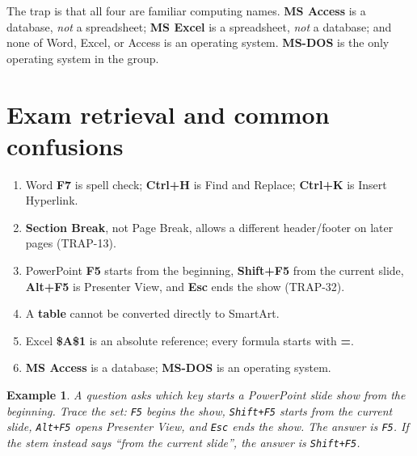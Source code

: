 \documentclass[11pt]{article}
\newtheorem{example}{Example}[section]
\begin{document}
The trap is that all four are familiar computing names. \textbf{MS Access} is
a database, \emph{not} a spreadsheet; \textbf{MS Excel} is a spreadsheet,
\emph{not} a database; and none of Word, Excel, or Access is an operating
system. \textbf{MS-DOS} is the only operating system in the group.

\section{Exam retrieval and common confusions}
\begin{enumerate}
  \item Word \textbf{F7} is spell check; \textbf{Ctrl+H} is Find and Replace;
    \textbf{Ctrl+K} is Insert Hyperlink.
  \item \textbf{Section Break}, not Page Break, allows a different
    header/footer on later pages (TRAP-13).
  \item PowerPoint \textbf{F5} starts from the beginning, \textbf{Shift+F5}
    from the current slide, \textbf{Alt+F5} is Presenter View, and
    \textbf{Esc} ends the show (TRAP-32).
  \item A \textbf{table} cannot be converted directly to SmartArt.
  \item Excel \textbf{\$A\$1} is an absolute reference; every formula starts
    with \textbf{=}.
  \item \textbf{MS Access} is a database; \textbf{MS-DOS} is an operating
    system.
\end{enumerate}

\begin{example}
A question asks which key starts a PowerPoint slide show from the beginning.
Trace the set: \texttt{F5} begins the show, \texttt{Shift+F5} starts from the
current slide, \texttt{Alt+F5} opens Presenter View, and \texttt{Esc} ends the
show. The answer is \texttt{F5}. If the stem instead says ``from the current
slide'', the answer is \texttt{Shift+F5}.
\end{example}
\end{document}
